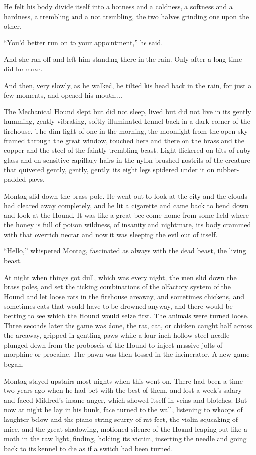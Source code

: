 \documentclass[11pt,openany]{book}
\begin{document}
He felt his body divide itself into a hotness and a coldness, a softness and a hardness, a trembling and a not trembling, the two halves grinding one upon the other.

``You'd better run on to your appointment,'' he said.

And she ran off and left him standing there in the rain. Only after a long time did he move.

And then, very slowly, as he walked, he tilted his head back in the rain, for just a few moments, and opened his mouth....

The Mechanical Hound slept but did not sleep, lived but did not live in its gently humming, gently vibrating, softly illuminated kennel back in a dark corner of the firehouse. The dim light of one in the morning, the moonlight from the open sky framed through the great window, touched here and there on the brass and the copper and the steel of the faintly trembling beast. Light flickered on bits of ruby glass and on sensitive capillary hairs in the nylon-brushed nostrils of the creature that quivered gently, gently, gently, its eight legs spidered under it on rubber-padded paws.

Montag slid down the brass pole. He went out to look at the city and the clouds had cleared away completely, and he lit a cigarette and came back to bend down and look at the Hound. It was like a great bee come home from some field where the honey is full of poison wildness, of insanity and nightmare, its body crammed with that overrich nectar and now it was sleeping the evil out of itself.

``Hello,'' whispered Montag, fascinated as always with the dead beast, the living beast.

At night when things got dull, which was every night, the men slid down the brass poles, and set the ticking combinations of the olfactory system of the Hound and let loose rats in the firehouse areaway, and sometimes chickens, and sometimes cats that would have to be drowned anyway, and there would be betting to see which the Hound would seize first. The animals were turned loose. Three seconds later the game was done, the rat, cat, or chicken caught half across the areaway, gripped in gentling paws while a four-inch hollow steel needle plunged down from the proboscis of the Hound to inject massive jolts of morphine or procaine. The pawn was then tossed in the incinerator. A new game began.

Montag stayed upstairs most nights when this went on. There had been a time two years ago when he had bet with the best of them, and lost a week's salary and faced Mildred's insane anger, which showed itself in veins and blotches. But now at night he lay in his bunk, face turned to the wall, listening to whoops of laughter below and the piano-string scurry of rat feet, the violin squeaking of mice, and the great shadowing, motioned silence of the Hound leaping out like a moth in the raw light, finding, holding its victim, inserting the needle and going back to its kennel to die as if a switch had been turned.
\end{document}
